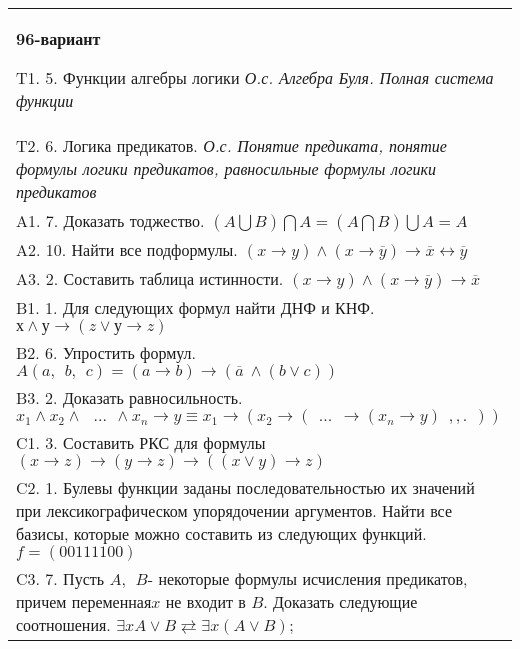 \documentclass{article}
\begin{document}
\begin{tabular}{m{17cm}}
\textbf{96-вариант}
\newline

T1. 5. Функции алгебры логики \emph{О.с. Алгебра Буля. Полная система функции} \\
T2. 6. Логика предикатов. \emph{О.с. Понятие предиката, понятие формулы логики предикатов, равносильные формулы логики предикатов} \\
A1. 7. Доказать тоджество. \((A\bigcup B)\bigcap A = (A\bigcap B)\bigcup A = A\) \\
A2. 10. Найти все подформулы. \((x \rightarrow y) \land (x \rightarrow \overline{y}) \rightarrow \overline{x} \leftrightarrow \overline{y}\) \\
A3. 2. Составить таблица истинности. \((x \rightarrow y) \land (x \rightarrow \overline{y}) \rightarrow \overline{x}\) \\
B1. 1. Для следующих формул найти ДНФ и КНФ. \(х \land у \rightarrow (z \vee у \rightarrow z)\) \\
B2. 6. Упростить формул. \(A(a,\ \ b,\ \ c) = (a \rightarrow b) \rightarrow (\overline{a}\  \land (b \vee c))\) \\
B3. 2. Доказать равносильность.\(x_{1} \land x_{2} \land \ \ \ ...\ \  \land x_{n} \rightarrow y \equiv x_{1} \rightarrow (x_{2} \rightarrow (\ \ ...\ \  \rightarrow (x_{n} \rightarrow y)\ \ ,,.\ \ ))\) \\
C1. 3. Составить РКС для формулы \((x \rightarrow z) \rightarrow (y \rightarrow z) \rightarrow ((x \vee y) \rightarrow z)\) \\
C2. 1. Булевы функции заданы последовательностью их значений при лексикографическом упорядочении аргументов. Найти все базисы, которые можно составить из следующих функций.\(f = (00111100)\) \\
C3. 7. Пусть \(A,\ \ B\)- некоторые формулы исчисления предикатов, причем переменная\(x\) не входит в \(B\). Доказать следующие соотношения. \(\exists xA \vee B \rightleftarrows \exists x(A \vee B)\); \\

\end{tabular}
\vspace{1cm}
\end{document}
